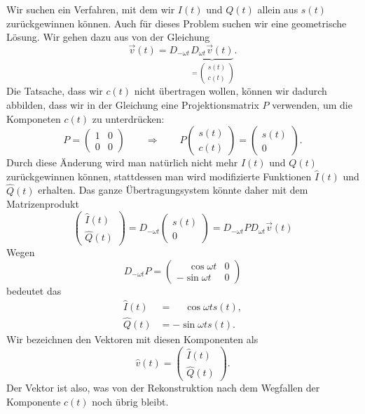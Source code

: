 Wir suchen ein Verfahren, mit dem wir $I(t)$ und $Q(t)$ allein aus
$s(t)$ zurückgewinnen können.
Auch für dieses Problem suchen wir eine geometrische Lösung.
Wir gehen dazu aus von der Gleichung
\[
\vec{v}(t)
=
D_{-\omega t}\underbrace{D_{\omega t}
\vec{v}(t)}_{=\begin{pmatrix}s(t)\\c(t)\end{pmatrix}}.
\]
Die Tatsache, dass wir $c(t)$ nicht übertragen wollen, können wir dadurch
abbilden, dass wir in der Gleichung eine Projektionsmatrix $P$
verwenden, um die Komponeten $c(t)$ zu unterdrücken:
\[
P=\begin{pmatrix}1&0\\0&0\end{pmatrix}
\qquad\Rightarrow\qquad
P\begin{pmatrix}s(t)\\c(t)\end{pmatrix}
=
\begin{pmatrix}s(t)\\0\end{pmatrix}.
\]
Durch diese Änderung wird man natürlich nicht mehr $I(t)$ und $Q(t)$ 
zurückgewinnen können, stattdessen man wird modifizierte Funktionen
$\hat{I}(t)$ und $\hat{Q}(t)$ erhalten.
Das ganze Übertragung\-system könnte daher mit dem Matrizenprodukt
\[
\begin{pmatrix}
\hat{I}(t)\\
\hat{Q}(t)
\end{pmatrix}
=
D_{-\omega t} \begin{pmatrix}s(t)\\0\end{pmatrix}
=
D_{-\omega t} P D_{\omega t}\vec{v}(t)
\]
Wegen
\[
D_{-\omega t}P
=
\begin{pmatrix}
\phantom{-}\cos\omega t & 0 \\
         - \sin\omega t & 0
\end{pmatrix}
\]
bedeutet das
\begin{align*}
\hat{I}(t) &= \phantom{-}\cos\omega t s(t),\\
\hat{Q}(t) &= -\sin\omega t s(t).
\end{align*}
Wir bezeichnen den Vektoren mit diesen Komponenten als
\[
\hat{v}(t) = \begin{pmatrix}\hat{I}(t)\\\hat{Q}(t)\end{pmatrix}.
\]
Der Vektor ist also, was von der Rekonstruktion nach dem Wegfallen
der Komponente $c(t)$ noch übrig bleibt.

